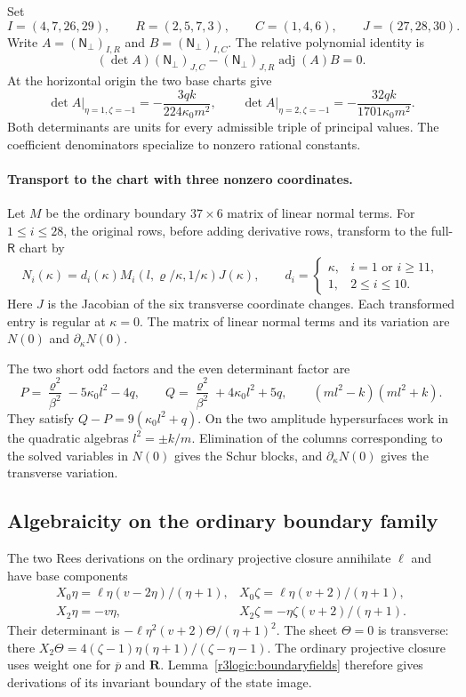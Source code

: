 \documentclass[11pt,a4paper]{article}
\numberwithin{equation}{section}
\theoremstyle{plain}
\theoremstyle{definition}
\theoremstyle{remark}
\begin{document}
Set
\[
 I=(4,7,26,29),\qquad
 R=(2,5,7,3),\qquad C=(1,4,6),\qquad
 J=(27,28,30).
\]
Write $A=(\mathsf N_\perp)_{I,R}$ and $B=(\mathsf N_\perp)_{I,C}$. The relative polynomial identity is
\[
 (\det A)(\mathsf N_\perp)_{J,C}-(\mathsf N_\perp)_{J,R}\operatorname{adj}(A)B=0.
\]
At the
horizontal origin the two base charts give
\[
 \left.\det A\right|_{\eta =1,\zeta =-1}
 =-\frac{3qk}{224\kappa_0 m^2},\qquad
 \left.\det A\right|_{\eta =2,\zeta =-1}
 =-\frac{32qk}{1701\kappa_0 m^2}.
\]
Both determinants are units for every admissible triple of principal
values. The coefficient denominators specialize to nonzero rational
constants.

\paragraph{Transport to the chart with three nonzero coordinates.}
Let $M$ be the ordinary boundary $37\times6$ matrix of linear normal terms.
For $1\le i\le28$, the original rows, before adding derivative rows, transform to
the full-$\mathsf R$ chart by
\[
 N_i(\kappa)=d_i(\kappa)
 M_i(l,\varrho/\kappa,1/\kappa)J(\kappa),
 \qquad
 d_i=\begin{cases}\kappa,&i=1\text{ or }i\geq11,\\
 1,&2\leq i\leq10.
 \end{cases}
\]
Here $J$ is the Jacobian of the six transverse coordinate
changes. Each transformed entry is regular at $\kappa=0$. The matrix of linear normal terms and its variation are $N(0)$ and $\partial_\kappa N(0)$.

The two short odd factors and the even determinant factor are
\[
 P=\frac{\varrho^2}{\beta^2}-5\kappa_0 l^2-4q,
 \qquad Q=\frac{\varrho^2}{\beta^2}+4\kappa_0 l^2+5q,
 \qquad (ml^2-k)(ml^2+k).
\]
They satisfy $Q-P=9(\kappa_0 l^2+q)$. On the two amplitude
hypersurfaces work in the quadratic algebras $l^2=\pm k/m$.
Elimination of the columns corresponding to the solved variables in $N(0)$ gives the Schur blocks,
and $\partial_\kappa N(0)$ gives the transverse variation.

\subsection{Algebraicity on the ordinary boundary family}
\label{appr3:ordinaryalgebraicity}

The two Rees derivations on the ordinary projective closure annihilate
$\ell$ and have base components
\[
\begin{array}{ll}
 X_0\eta =\ell \eta (v-2\eta )/(\eta +1),&
 X_0\zeta =\ell \eta (v+2)/(\eta +1),\\
 X_2\eta =-v\eta ,&X_2\zeta =-\eta \zeta (v+2)/(\eta +1).
\end{array}
\]
Their determinant is
$-\ell \eta ^2(v+2)\Theta/(\eta +1)^2$. The sheet $\Theta=0$ is transverse:
there $X_2\Theta=4(\zeta -1)\eta (\eta +1)/(\zeta -\eta -1)$.
The ordinary projective closure uses weight one for $\overline p$ and $\boldsymbol R$.
Lemma~\ref{r3logic:boundaryfields} therefore gives derivations of its
invariant boundary of the state image. 
\end{document}
